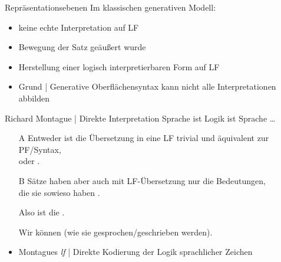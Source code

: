 \begin{frame}
{
  }
\end{frame}

\begin{frame}
  {Repräsentationsebenen}
  \onslide<+->
  \onslide<+->
  Im klassischen generativen Modell:\\
  \Zeile
  \begin{itemize}[<+->]
    \item keine echte Interpretation auf LF
    \item Bewegung  der Satz geäußert wurde
    \item Herstellung einer logisch interpretierbaren \alert{Form} auf LF
    \item Grund | Generative Oberflächensyntax kann nicht alle Interpretationen abbilden
  \end{itemize}
\end{frame}


\begin{frame}
  {Richard Montague | Direkte Interpretation}
  \onslide<+->
  \onslide<+->
  Sprache ist Logik ist Sprache \ldots\\
  \Halbzeile
  \begin{itemize}[<+->]
    \item[A] Entweder ist die \alert{Übersetzung in eine LF trivial und äquivalent zur PF\slash Syntax},\\
      oder .
    \item[B] Sätze haben aber auch \alert{mit LF-Übersetzung nur die Bedeutungen,\\
      die sie sowieso haben} .
    \item[\ding{222}] Also ist die .
    \item[\ding{222}] Wir können  (wie sie gesprochen\slash geschrieben werden).
     \Zeile 
   \item \alert{Montagues \textit{lf}} | Direkte Kodierung der Logik sprachlicher Zeichen
  \end{itemize}
\end{frame}

